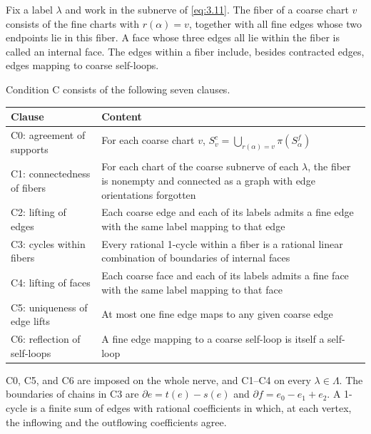 \begin{definition}\label{def:3.15}

Fix a label $\lambda$ and work in the subnerve of \eqref{eq:3.11}.
The fiber of a coarse chart $v$ consists of the fine charts with $r(\alpha)=v$,
together with all fine edges whose two endpoints lie in this fiber.
A face whose three edges all lie within the fiber is called an internal face.
The edges within a fiber include, besides contracted edges, edges mapping to coarse
self-loops.

Condition C consists of the following seven clauses.

\begin{xltabular}{\linewidth}{@{}LL@{}}
\toprule
Clause & Content \\
\midrule
\endhead
C0: agreement of supports & For each coarse chart $v$, $S^c_v=\bigcup_{r(\alpha)=v}\pi(S^f_\alpha)$ \\
\addlinespace[3pt]
C1: connectedness of fibers & For each chart of the coarse subnerve of each $\lambda$, the fiber is nonempty and connected as a graph with edge orientations forgotten \\
\addlinespace[3pt]
C2: lifting of edges & Each coarse edge and each of its labels admits a fine edge with the same label mapping to that edge \\
\addlinespace[3pt]
C3: cycles within fibers & Every rational 1-cycle within a fiber is a rational linear combination of boundaries of internal faces \\
\addlinespace[3pt]
C4: lifting of faces & Each coarse face and each of its labels admits a fine face with the same label mapping to that face \\
\addlinespace[3pt]
C5: uniqueness of edge lifts & At most one fine edge maps to any given coarse edge \\
\addlinespace[3pt]
C6: reflection of self-loops & A fine edge mapping to a coarse self-loop is itself a self-loop \\
\bottomrule
\end{xltabular}

C0, C5, and C6 are imposed on the whole nerve, and C1--C4 on every
$\lambda\in\Lambda$. The boundaries of chains in C3 are $\partial e=t(e)-s(e)$ and
$\partial f=e_0-e_1+e_2$. A 1-cycle is a finite sum of edges with rational
coefficients in which, at each vertex, the inflowing and the outflowing coefficients
agree.

\end{definition}

